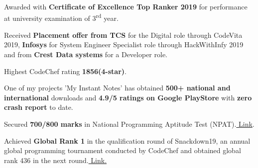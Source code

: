 \noindent



  \begin{cventries}

\begin{cvitems} %
\item{ {\fontsize{9pt}{1em}\bodyfontlight\upshape\color{text} Awarded with \textbf{Certificate of Excellence Top Ranker 2019 }for performance at university examination of 3\textsuperscript{rd} year.}}
\item{{\fontsize{9pt}{1em}\bodyfontlight\upshape\color{text} Received \textbf{Placement offer from TCS} for the Digital role through CodeVita 2019,  \textbf{Infosys} for System Engineer Specialist role through HackWithInfy 2019 and from \textbf{Crest Data systems} for a Developer role.}}
\item{{\fontsize{9pt}{1em}\bodyfontlight\upshape\color{text}Highest CodeChef rating \textbf{1856(4-star)}}.}
\item{{\fontsize{9pt}{1em}\bodyfontlight\upshape\color{text} One of my projects 'My Instant Notes' has obtained \textbf{500+ national and international} downloads and \textbf{4.9/5 ratings on Google PlayStore} with \textbf{zero crash report} to date.}}
 \item {\fontsize{9pt}{1em}\bodyfontlight\upshape\color{text} Secured \textbf{700/800 marks }in National Programming Aptitude Test (NPAT).\href{https://drive.google.com/open?id=19GsoeP4D9Bw4d8MdDmASp_mzMwAXBJOp}{ Link}.}
 \item {{\fontsize{9pt}{1em}\bodyfontlight\upshape\color{text} Achieved\textbf{ Global Rank 1} in the qualification round of Snackdown19, an annual global programming tournament conducted by CodeChef and obtained global rank 436 in the next round.\href{https://www.codechef.com/certificates/public/769487e}{ Link.}}}

\end{cvitems}
\end{cventries}
